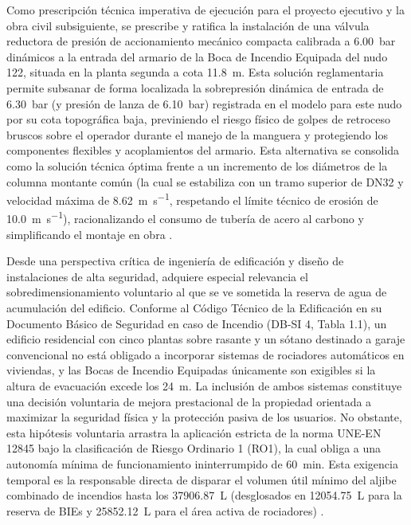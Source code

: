 \documentclass[12pt,a4paper]{article}
\begin{document}
Como prescripción técnica imperativa de ejecución para el proyecto ejecutivo y la obra civil subsiguiente, se prescribe y ratifica la instalación de una válvula reductora de presión de accionamiento mecánico compacta calibrada a \SI{6.00}{\bar} dinámicos a la entrada del armario de la Boca de Incendio Equipada del nudo 122, situada en la planta segunda a cota \SI{11.8}{\meter}. Esta solución reglamentaria permite subsanar de forma localizada la sobrepresión dinámica de entrada de \SI{6.30}{\bar} (y presión de lanza de \SI{6.10}{\bar}) registrada en el modelo para este nudo por su cota topográfica baja, previniendo el riesgo físico de golpes de retroceso bruscos sobre el operador durante el manejo de la manguera y protegiendo los componentes flexibles y acoplamientos del armario. Esta alternativa se consolida como la solución técnica óptima frente a un incremento de los diámetros de la columna montante común (la cual se estabiliza con un tramo superior de DN32 y velocidad máxima de \SI{8.62}{\meter\per\second}, respetando el límite técnico de erosión de \SI{10.0}{\meter\per\second}), racionalizando el consumo de tubería de acero al carbono y simplificando el montaje en obra \parencite{RIPCI_GUIA_2022,UNE_EN_671_1}.

Desde una perspectiva crítica de ingeniería de edificación y diseño de instalaciones de alta seguridad, adquiere especial relevancia el sobredimensionamiento voluntario al que se ve sometida la reserva de agua de acumulación del edificio. Conforme al Código Técnico de la Edificación en su Documento Básico de Seguridad en caso de Incendio (DB-SI 4, Tabla 1.1), un edificio residencial con cinco plantas sobre rasante y un sótano destinado a garaje convencional no está obligado a incorporar sistemas de rociadores automáticos en viviendas, y las Bocas de Incendio Equipadas únicamente son exigibles si la altura de evacuación excede los \SI{24}{\meter}. La inclusión de ambos sistemas constituye una decisión voluntaria de mejora prestacional de la propiedad orientada a maximizar la seguridad física y la protección pasiva de los usuarios. No obstante, esta hipótesis voluntaria arrastra la aplicación estricta de la norma UNE-EN 12845 bajo la clasificación de Riesgo Ordinario 1 (RO1), la cual obliga a una autonomía mínima de funcionamiento ininterrumpido de \SI{60}{\minute}. Esta exigencia temporal es la responsable directa de disparar el volumen útil mínimo del aljibe combinado de incendios hasta los \SI{37906.87}{\liter} (desglosados en \SI{12054.75}{\liter} para la reserva de BIEs y \SI{25852.12}{\liter} para el área activa de rociadores) \parencite{CTE_DBSI,UNE_EN_12845}. 
\end{document}
